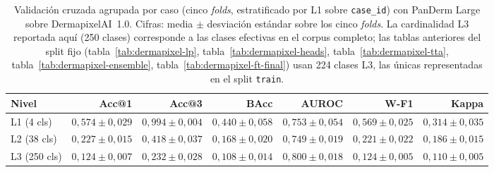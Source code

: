 \begin{table}[H]
\centering
\footnotesize
\setlength{\tabcolsep}{4pt}
\renewcommand{\arraystretch}{0.95}
\caption{Validación cruzada agrupada por caso (cinco \emph{folds},
estratificado por L1 sobre \texttt{case\_id}) con PanDerm Large
sobre DermapixelAI~1.0. Cifras: media $\pm$ desviación estándar
sobre los cinco \emph{folds}. La cardinalidad L3 reportada aquí
(250 clases) corresponde a las clases efectivas en el corpus
completo; las tablas anteriores del split fijo
(tabla~\ref{tab:dermapixel-lp}, tabla~\ref{tab:dermapixel-heads},
tabla~\ref{tab:dermapixel-tta}, tabla~\ref{tab:dermapixel-ensemble},
tabla~\ref{tab:dermapixel-ft-final}) usan 224 clases L3, las
únicas representadas en el split \texttt{train}.}
\label{tab:dermapixel-cv}
\begin{tabular}{lrrrrrr}
\hline
Nivel           & Acc@1                 & Acc@3                 & BAcc                  & AUROC                 & W-F1                  & Kappa \\
\hline
L1 (4 cls)      & $0{,}574 \pm 0{,}029$ & $0{,}994 \pm 0{,}004$ & $0{,}440 \pm 0{,}058$ & $0{,}753 \pm 0{,}054$ & $0{,}569 \pm 0{,}025$ & $0{,}314 \pm 0{,}035$ \\
L2 (38 cls)     & $0{,}227 \pm 0{,}015$ & $0{,}418 \pm 0{,}037$ & $0{,}168 \pm 0{,}020$ & $0{,}749 \pm 0{,}019$ & $0{,}221 \pm 0{,}022$ & $0{,}186 \pm 0{,}015$ \\
L3 (250 cls)    & $0{,}124 \pm 0{,}007$ & $0{,}232 \pm 0{,}028$ & $0{,}108 \pm 0{,}014$ & $0{,}800 \pm 0{,}018$ & $0{,}124 \pm 0{,}005$ & $0{,}110 \pm 0{,}005$ \\
\hline
\end{tabular}
\end{table}

